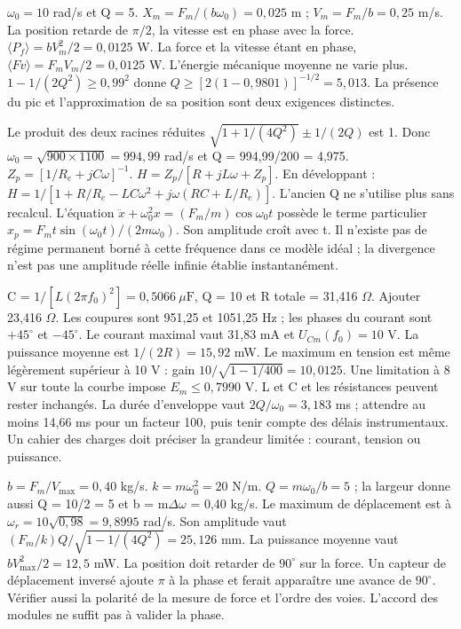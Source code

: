 $\omega_0=10$ rad/s et Q = 5. $X_m=F_m/(b\omega_0)=0{,}025$ m ; $V_m=F_m/b=0{,}25$ m/s. La position retarde de $\pi/2$, la vitesse est en phase avec la force.
$\langle P_f\rangle=bV_m^2/2=0{,}0125$ W. La force et la vitesse étant en phase, $\langle Fv\rangle=F_mV_m/2=0{,}0125$ W. L’énergie mécanique moyenne ne varie plus.
$1-1/(2Q^2)\geq0{,}99^2$ donne $Q\geq[2(1-0{,}9801)]^{-1/2}=5{,}013$. La présence du pic et l’approximation de sa position sont deux exigences distinctes.


Le produit des deux racines réduites $\sqrt{1+1/(4Q^2)}\pm1/(2Q)$ est 1. Donc $\omega_0=\sqrt{900\times1100}=994{,}99$ rad/s et Q = 994,99/200 = 4,975.
$Z_p=[1/R_e+jC\omega]^{-1}$. $H=Z_p/[R+jL\omega+Z_p]$. En développant : $H=1/[1+R/R_e-LC\omega^2+j\omega(RC+L/R_e)]$. L’ancien Q ne s’utilise plus sans recalcul.
L’équation $\ddot x+\omega_0^2x=(F_m/m)\cos\omega_0t$ possède le terme particulier $x_p=F_mt\sin(\omega_0t)/(2m\omega_0)$. Son amplitude croît avec t. Il n’existe pas de régime permanent borné à cette fréquence dans ce modèle idéal ; la divergence n’est pas une amplitude réelle infinie établie instantanément.


C = $1/[L(2\pi f_0)^2]=0{,}5066\ \mu\mathrm F$, Q = 10 et R totale = 31,416 $\Omega$. Ajouter 23,416 $\Omega$. Les coupures sont 951,25 et 1051,25 Hz ; les phases du courant sont $+45^\circ$ et $-45^\circ$. Le courant maximal vaut 31,83 mA et $U_{Cm}(f_0)=10$ V. La puissance moyenne est $1/(2R)=15{,}92$ mW. Le maximum en tension est même légèrement supérieur à 10 V : gain $10/\sqrt{1-1/400}=10{,}0125$. Une limitation à 8 V sur toute la courbe impose $E_m\leq0{,}7990$ V. L et C et les résistances peuvent rester inchangés. La durée d’enveloppe vaut $2Q/\omega_0=3{,}183$ ms ; attendre au moins 14,66 ms pour un facteur 100, puis tenir compte des délais instrumentaux. Un cahier des charges doit préciser la grandeur limitée : courant, tension ou puissance.

$b=F_m/V_{\max}=0{,}40$ kg/s. $k=m\omega_0^2=20$ N/m. $Q=m\omega_0/b=5$ ; la largeur donne aussi Q = 10/2 = 5 et b = m\ensuremath{\Delta}\ensuremath{\omega} = 0,40 kg/s. Le maximum de déplacement est à $\omega_r=10\sqrt{0{,}98}=9{,}8995$ rad/s. Son amplitude vaut $(F_m/k)Q/\sqrt{1-1/(4Q^2)}=25{,}126$ mm. La puissance moyenne vaut $bV_{\max}^2/2=12{,}5$ mW. La position doit retarder de $90^\circ$ sur la force. Un capteur de déplacement inversé ajoute $\pi$ à la phase et ferait apparaître une avance de $90^\circ$. Vérifier aussi la polarité de la mesure de force et l’ordre des voies. L’accord des modules ne suffit pas à valider la phase.

